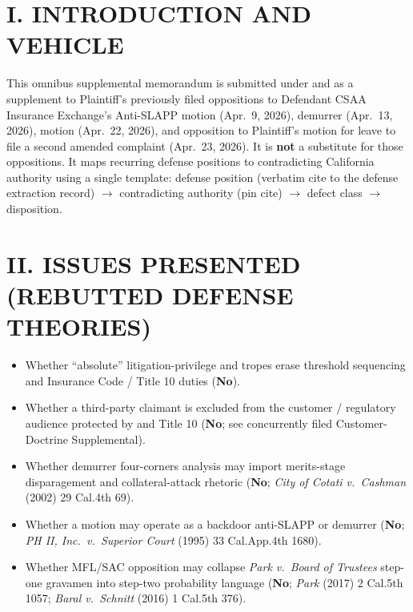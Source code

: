 \newcommand{\docshorttitle}{OMNIBUS SUPPL.\ P\&A --- BLACK-LETTER CONTRADICTIONS (CGC-25-631802)}
\newcommand{\doctitleblock}{PLAINTIFF'S OMNIBUS SUPPL.\ P\&A --- BLACK-LETTER CONTRADICTIONS (CSAA; MULTI-MOTION DOCKET)}
\newcommand{\docsubblock}{(Cal.\ Rules of Court, rules 3.1113, 3.1306(c); supplemental only; cross-noticed hearings on caption.)}




\section*{I. INTRODUCTION AND VEHICLE}

This omnibus supplemental memorandum is submitted under  and  as a supplement to Plaintiff's previously filed oppositions to Defendant CSAA Insurance Exchange's Anti-SLAPP motion (Apr.\ 9, 2026), demurrer (Apr.\ 13, 2026),  motion (Apr.\ 22, 2026), and opposition to Plaintiff's motion for leave to file a second amended complaint (Apr.\ 23, 2026). It is \textbf{not} a substitute for those oppositions. It maps recurring defense positions to contradicting California authority using a single template: defense position (verbatim cite to the defense extraction record) $\rightarrow$ contradicting authority (pin cite) $\rightarrow$ defect class $\rightarrow$ disposition.

\section*{II. ISSUES PRESENTED (REBUTTED DEFENSE THEORIES)}

\begin{itemize}
\tightlist
\item Whether ``absolute'' litigation-privilege and  tropes erase threshold  sequencing and Insurance Code / Title 10 duties (\textbf{No}).
\item Whether a third-party claimant is excluded from the customer / regulatory audience protected by  and Title 10 (\textbf{No}; see concurrently filed Customer-Doctrine Supplemental).
\item Whether demurrer four-corners analysis may import merits-stage disparagement and collateral-attack rhetoric (\textbf{No}; \textit{City of Cotati v.\ Cashman} (2002) 29 Cal.4th 69).
\item Whether a  motion may operate as a backdoor anti-SLAPP or demurrer (\textbf{No}; \textit{PH II, Inc.\ v.\ Superior Court} (1995) 33 Cal.App.4th 1680).
\item Whether MFL/SAC opposition may collapse \textit{Park v.\ Board of Trustees} step-one gravamen into step-two probability language (\textbf{No}; \textit{Park} (2017) 2 Cal.5th 1057; \textit{Baral v.\ Schnitt} (2016) 1 Cal.5th 376).
\end{itemize}

